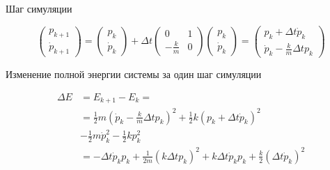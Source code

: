 \documentclass{article}
\begin{document}
Шаг симуляции

\[
    \begin{pmatrix}
        p_{k+1} \\
        \dot{p}_{k+1}
    \end{pmatrix}
    =
    \begin{pmatrix}
        p_k \\
        \dot{p}_k
    \end{pmatrix}
    + \Delta t \begin{pmatrix}
        0             & 1 \\
        - \frac{k}{m} & 0
    \end{pmatrix}
    \begin{pmatrix}
        p_k \\
        \dot{p}_k
    \end{pmatrix}
    =
    \begin{pmatrix}
        p_k + \Delta t \dot{p}_k \\
        \dot{p}_k - \frac{k}{m} \Delta t p_k
    \end{pmatrix}
\]

Изменение полной энергии системы за один шаг симуляции

\begin{align*}
    \Delta E & = E_{k+1} - E_k  =                                                                                    \\
             & = \frac{1}{2} m (\dot{p}_k - \frac{k}{m} \Delta t p_k)^2 + \frac{1}{2} k (p_k + \Delta t \dot{p}_k)^2 \\
             & - \frac{1}{2} m \dot{p}_k^2 - \frac{1}{2} k p_k^2 \\
             & = - \Delta t \dot{p}_k p_k + \frac{1}{2m} (k \Delta t p_k)^2 + k \Delta t \dot{p}_k p_k + \frac{k}{2} (\Delta t \dot{p}_k)^2
\end{align*}
\end{document}
